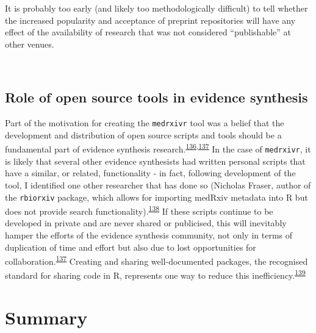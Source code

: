 \documentclass[a4paper, twoside]{templates/ociamthesis}
\begin{document}
It is probably too early (and likely too methodologically difficult) to tell whether the increased popularity and acceptance of preprint repositories will have any effect of the availability of research that was not considered ``publishable'' at other venues.

~

\hypertarget{role-of-open-source-tools-in-evidence-synthesis}{%
\subsection{Role of open source tools in evidence synthesis}\label{role-of-open-source-tools-in-evidence-synthesis}}

Part of the motivation for creating the \texttt{medrxivr} tool was a belief that the development and distribution of open source scripts and tools should be a fundamental part of evidence synthesis research.\textsuperscript{\protect\hyperlink{ref-goldacre2019}{136},\protect\hyperlink{ref-mckiernan2016}{137}} In the case of \texttt{medrxivr}, it is likely that several other evidence synthesists had written personal scripts that have a similar, or related, functionality - in fact, following development of the tool, I identified one other researcher that has done so (Nicholas Fraser, author of the \texttt{rbiorxiv} package, which allows for importing medRxiv metadata into R but does not provide search functionality).\textsuperscript{\protect\hyperlink{ref-fraser2020rbiorixv}{138}} If these scripts continue to be developed in private and are never shared or publicised, this will inevitably hamper the efforts of the evidence synthesis community, not only in terms of duplication of time and effort but also due to lost opportunities for collaboration.\textsuperscript{\protect\hyperlink{ref-mckiernan2016}{137}} Creating and sharing well-documented packages, the recognised standard for sharing code in R, represents one way to reduce this inefficiency.\textsuperscript{\protect\hyperlink{ref-vuorre2020}{139}}

\hypertarget{summary-1}{%
\section{Summary}\label{summary-1}}
\end{document}
